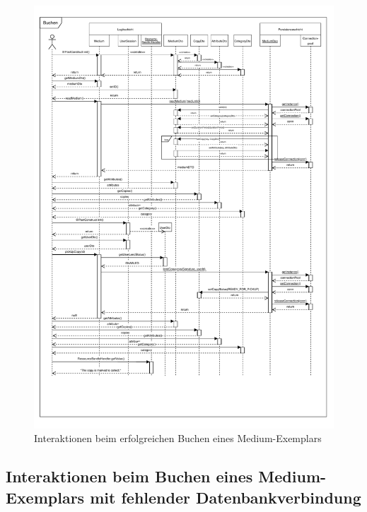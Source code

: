 \documentclass{article}
\begin{document}
\begin{figure}[h]
    \centering
    \includegraphics[width = 50em]{Sequenzdiagramm-success-v4.1}
    \caption{Interaktionen beim erfolgreichen Buchen eines Medium-Exemplars}
    \label{Sequenzdiagramm}
\end{figure}
\restoregeometry

\subsection{Interaktionen beim Buchen eines Medium-Exemplars mit fehlender Datenbankverbindung}
\end{document}
